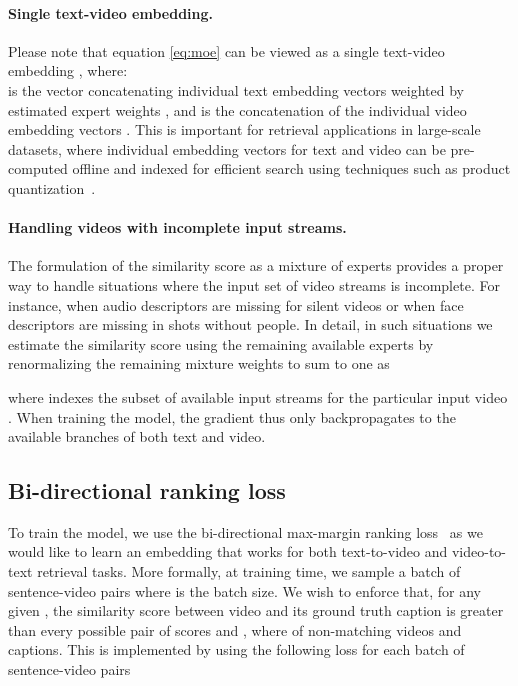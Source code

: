 \documentclass[runningheads]{llncs}
\begin{document}
\paragraph{Single text-video embedding.}
Please note that equation \eqref{eq:moe} can be viewed as a single text-video embedding , where:\\  is the vector concatenating individual text embedding vectors  weighted by estimated expert weights , and   is the concatenation of the individual video embedding vectors . This is important for retrieval applications in large-scale datasets, where individual embedding vectors for text and video can be pre-computed offline and indexed for efficient search using techniques such as product quantization~\cite{jegou11product}.


\paragraph{Handling videos with incomplete input streams.} 
The formulation of the similarity score  as a mixture of experts provides a proper way to handle situations where the input set of video streams is incomplete. For instance, when audio descriptors are missing for silent videos or when face descriptors are missing in shots without people.  In detail, in such situations we estimate the similarity score  using the remaining available experts by renormalizing the remaining mixture weights to sum to one as  

 where  indexes the subset of available input streams  for the particular input video . 
When training the model, the gradient thus only backpropagates to the available branches of both text and video.


\subsection{Bi-directional ranking loss}
To train the model, we use the bi-directional max-margin ranking loss~\cite{karpathy14deepfragment,wang2016learning,yu16videocaptioning,wang2018learning} as we would like to learn an embedding that works for both text-to-video and video-to-text retrieval tasks.
More formally, at training time, we sample a batch of sentence-video pairs  where  is the batch size. We wish to enforce that, for any given , the similarity score  between video  and its ground truth caption  is greater than every possible pair of scores  and , where  of non-matching videos and captions. This is implemented by using the following loss for each batch of  sentence-video pairs 
\end{document}
